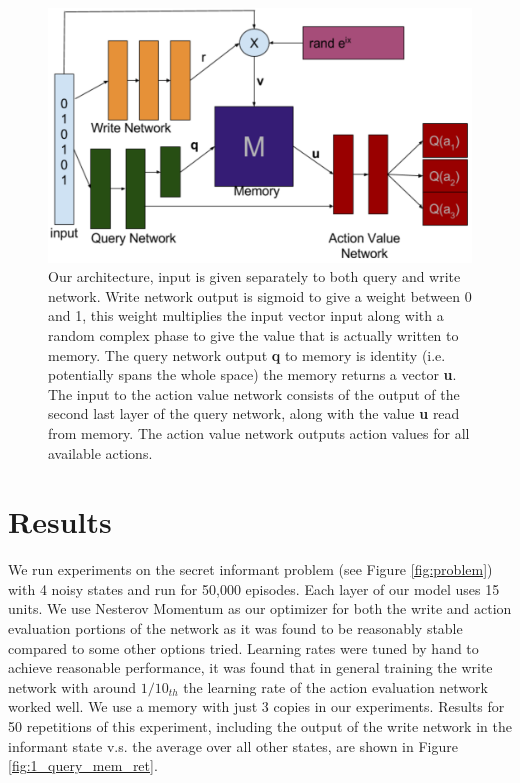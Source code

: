 \documentclass{article}
\begin{document}
\begin{figure}[!ht]
\includegraphics[width=1\textwidth]{images/architecture.png}
\caption{Our architecture, input is given separately to both query and write network. Write network output is sigmoid to give a weight between 0 and 1, this weight multiplies the input vector input along with a random complex phase to give the value that is actually written to memory. The query network output \textbf{q} to memory is identity (i.e. potentially spans the whole space) the memory returns a vector \textbf{u}. The input to the action value network consists of the output of the second last layer of the query network, along with the value \textbf{u} read from memory. The action value network outputs action values for all available actions.  }
\label{fig:arch}
\end{figure}

\section*{Results}
We run experiments on the secret informant problem (see Figure \ref{fig:problem}) with 4 noisy states and run for 50,000 episodes. Each layer of our model uses 15 units. We use Nesterov Momentum as our optimizer for both the write and action evaluation portions of the network as it was found to be reasonably stable compared to some other options tried. Learning rates were tuned by hand to achieve reasonable performance, it was found that in general training the write network with around $1/10_{th}$ the learning rate of the action evaluation network worked well. We use a memory with just 3 copies in our experiments. Results for 50 repetitions of this experiment, including the output of the write network in the informant state v.s. the average over all other states, are shown in Figure \ref{fig:1_query_mem_ret}.
\end{document}
